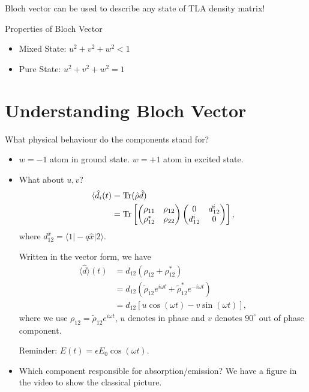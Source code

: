 \documentclass[../../note.tex]{subfiles}
\begin{document}
Bloch vector can be used to describe any state of TLA density matrix!

Properties of Bloch Vector
\begin{itemize}
    \item Mixed State: $u^2 + v^2 +w^2 < 1 $
    \item Pure State: $u^2 + v^2 +w^2 = 1 $
\end{itemize}

\section{Understanding Bloch Vector}
What physical behaviour do the components stand for?

\begin{itemize}
    \item $w=-1$ atom in ground state. $w = +1$ atom in excited state.
    \item What about $u,v$?
    \begin{align}
        \langle \hat{d}_i(t)
        &= \operatorname{Tr}(\hat{\rho} \hat{d}) \\
        &= \operatorname{Tr}\left[\left(\begin{matrix}
            \rho_{11} & \rho_{12} \\
            \rho_{12}^\ast & \rho_{22} 
        \end{matrix}\right) \left(\begin{matrix}
            0 & d_{12}^i \\
            d_{12}^i & 0
        \end{matrix}\right)\right],
    \end{align}
    where $d_{12}^x = \langle 1 \vert -q \hat{x} \vert 2 \rangle$.

    Written in the vector form, we have
    \begin{align}
        \langle \hat{d}  \rangle(t)
        &= d_{12} \left(\rho_{12} + \rho_{12}^\ast \right) \\
        &= d_{12} \left(\tilde{\rho}_{12} e^{i \omega t} + \tilde{\rho}_{12}^\ast e^{-i \omega t}\right) \\
        &= d_{12} \left[u\cos(\omega t) - v \sin(\omega t) \right],
    \end{align}
    where we use $\rho_{12} = \tilde{\rho}_{12} e^{i \omega t}$, $u$ denotes in phase and $v$ denotes $90^\circ$ out of phase component.

    Reminder: $E(t) = \epsilon E_0 \cos(\omega t)$.
    \item Which component responsible for absorption/emission? We have a figure in the video to show the classical picture.
    

\end{itemize}
\end{document}
